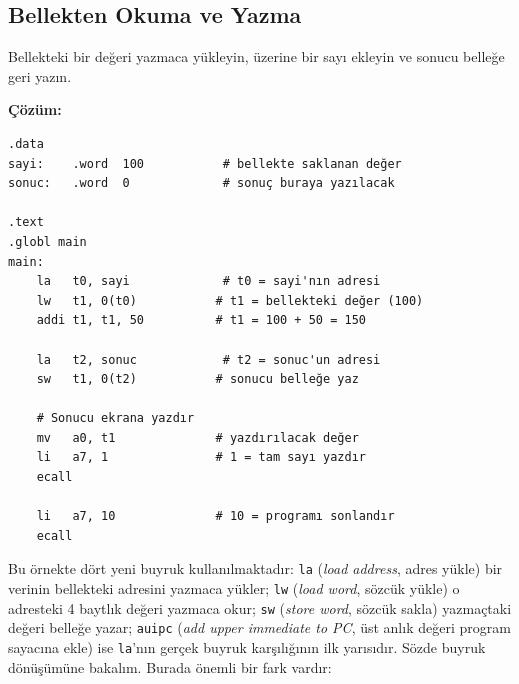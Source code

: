 \subsection{Bellekten Okuma ve Yazma}
\label{subsec:bellekten-okuma-yazma}

\begin{ornek}[4.2]
\label{orn:bellek-oku-yaz}
Bellekteki bir değeri yazmaca yükleyin, üzerine bir sayı ekleyin ve sonucu belleğe geri yazın.

\textbf{Çözüm:}

\begin{lstlisting}[style=riscv]
.data
sayi:    .word  100           # bellekte saklanan değer
sonuc:   .word  0             # sonuç buraya yazılacak

.text
.globl main
main:
    la   t0, sayi             # t0 = sayi'nın adresi
    lw   t1, 0(t0)           # t1 = bellekteki değer (100)
    addi t1, t1, 50          # t1 = 100 + 50 = 150

    la   t2, sonuc            # t2 = sonuc'un adresi
    sw   t1, 0(t2)           # sonucu belleğe yaz

    # Sonucu ekrana yazdır
    mv   a0, t1              # yazdırılacak değer
    li   a7, 1               # 1 = tam sayı yazdır
    ecall

    li   a7, 10              # 10 = programı sonlandır
    ecall
\end{lstlisting}

Bu örnekte dört yeni buyruk kullanılmaktadır: \texttt{la} (\emph{load address}, adres yükle) bir verinin bellekteki adresini yazmaca yükler; \texttt{lw} (\emph{load word}, sözcük yükle) o adresteki 4 baytlık değeri yazmaca okur; \texttt{sw} (\emph{store word}, sözcük sakla) yazmaçtaki değeri belleğe yazar; \texttt{auipc} (\emph{add upper immediate to PC}, üst anlık değeri program sayacına ekle) ise \texttt{la}'nın gerçek buyruk karşılığının ilk yarısıdır. Sözde buyruk dönüşümüne bakalım. Burada önemli bir fark vardır:


\end{ornek}

